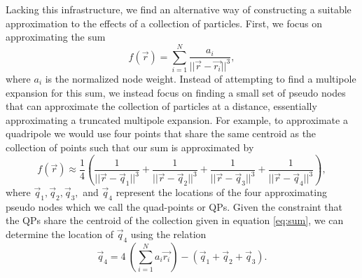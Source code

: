 Lacking this infrastructure, we find an alternative way of
constructing a suitable approximation to the effects of a collection
of particles.  First, we focus on approximating the sum
\begin{equation}
f(\vec{r}) = \sum_{i=1}^N \frac{a_i}{||\vec{r}-\vec{r_i}||^3},
\label{eq:sum}
\end{equation}
where $a_i$ is the normalized node weight.  Instead of attempting to
find a multipole expansion for this sum, we instead focus on finding a
small set of pseudo nodes that can approximate the collection of
particles at a distance, essentially approximating a truncated
multipole expansion.  For example, to approximate a quadripole we
would use four points that share the same centroid as the collection
of points such that our sum is approximated by
\begin{equation}
f(\vec{r}) \approx \frac{1}{4}\left( \frac{1}{||\vec{r}-\vec{q}_1||^3}
+\frac{1}{||\vec{r}-\vec{q}_2||^3}
+\frac{1}{||\vec{r}-\vec{q}_3||^3}
+\frac{1}{||\vec{r}-\vec{q}_4||^3}\right),
\label{eq:approx}
\end{equation}
where $\vec{q}_1,\vec{q}_2,\vec{q}_3,$ and $\vec{q}_4$ represent the
locations of the four approximating pseudo nodes which we call
the quad-points or QPs.  Given the constraint that the QPs share the centroid of the collection given in equation \ref{eq:sum}, we can determine the location of $\vec{q}_4$ using the relation
\begin{equation}
\vec{q}_4 = 4~\left( \sum_{i=1}^N a_i \vec{r_i} \right) - \left( \vec{q}_1 + \vec{q}_2 + \vec{q}_3\right).
\label{eq:centroidconstraint}
\end{equation}

